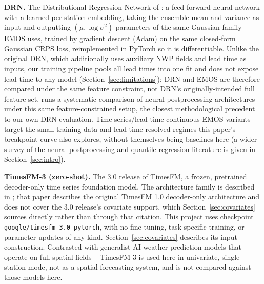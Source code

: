 \textbf{DRN.} The Distributional Regression Network of
\citet{rasp_2018_drn}: a feed-forward neural network with a learned
per-station embedding, taking the ensemble mean and variance as input and
outputting \((\mu, \log\sigma^2)\) parameters of the same Gaussian family
EMOS uses, trained by gradient descent (Adam) on the same closed-form
Gaussian CRPS loss, reimplemented in PyTorch so it is differentiable. Unlike
the original DRN, which additionally uses auxiliary NWP fields and lead time
as inputs, our training pipeline pools all \NLeadTimes{} lead times into one
fit and does not expose lead time to any model (Section~\ref{sec:limitations});
DRN and EMOS are therefore compared under the same feature constraint, not
DRN's originally-intended full feature set. \citet{schulz_2021_windgusts}
runs a systematic comparison of neural postprocessing architectures under
this same feature-constrained setup, the closest methodological precedent
to our own DRN evaluation. Time-series/lead-time-continuous EMOS variants
\citep{jobst_2024_ts_emos,wessel_2024_leadtime_continuous} target the
small-training-data and lead-time-resolved regimes this paper's breakpoint
curve also explores, without themselves being baselines here (a wider
survey of the neural-postprocessing and quantile-regression literature is
given in Section~\ref{sec:intro}).

\textbf{TimesFM-3 (zero-shot).} The 3.0 release of TimesFM, a frozen,
pretrained decoder-only time series foundation model. The architecture
family is described in \citet{das_2024_timesfm_icml}; that paper describes the
original TimesFM 1.0 decoder-only architecture and does not cover the
3.0 release's covariate support, which Section~\ref{sec:covariates}
sources directly rather than through that citation. This project uses
checkpoint \texttt{google/timesfm-3.0-pytorch}, with no fine-tuning,
task-specific training, or parameter updates of any kind.
Section~\ref{sec:covariates} describes its input construction. Contrasted
with generalist AI weather-prediction models that operate on full spatial
fields \citep{lam_2023_graphcast,price_2024_gencast,bodnar_2025_aurora} --
TimesFM-3 is used here in univariate, single-station mode, not as a
spatial forecasting system, and is not compared against those models
here.

